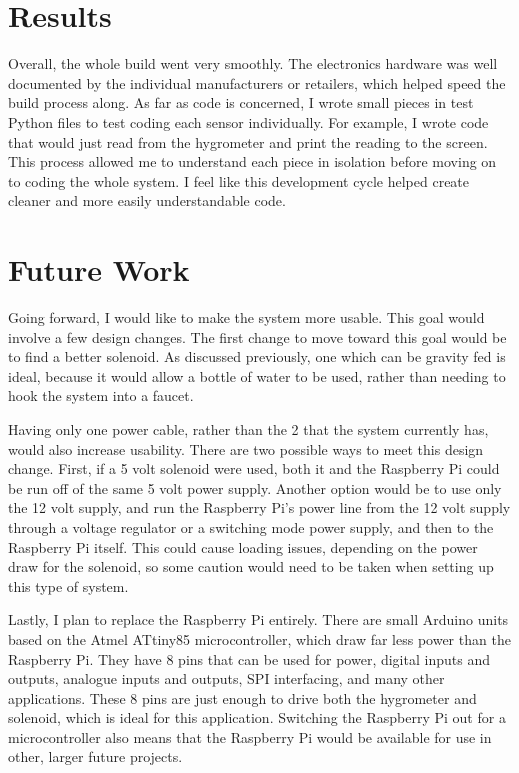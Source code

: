 \documentclass[11pt] {article}
\begin{document}

\section{Results}
Overall, the whole build went very smoothly. The electronics hardware was well documented by the individual
manufacturers or retailers, which helped speed the build process along. As far as code is concerned, I wrote small
pieces in test Python files to test coding each sensor individually. For example, I wrote code that would just read
from the hygrometer and print the reading to the screen. This process allowed me to understand each piece in isolation
before moving on to coding the whole system. I feel like this development cycle helped create cleaner and more easily
understandable code.

\section{Future Work}
Going forward, I would like to make the system more usable. This goal would involve a few design changes. The first
change to move toward this goal would be to find a better solenoid. As discussed previously, one which can be gravity
fed is ideal, because it would allow a bottle of water to be used, rather than needing to hook the system into a
faucet.

Having only one power cable, rather than the 2 that the system currently has, would also increase usability. There are
two possible ways to meet this design change. First, if a 5 volt solenoid were used, both it and the Raspberry Pi could
be run off of the same 5 volt power supply. Another option would be to use only the 12 volt supply, and run the
Raspberry Pi's power line from the 12 volt supply through a voltage regulator or a switching mode power supply,
and then to the Raspberry Pi itself. This could cause loading issues, depending on the power draw for the solenoid, so
some caution would need to be taken when setting up this type of system.

Lastly, I plan to replace the Raspberry Pi entirely. There are small Arduino units based on the Atmel ATtiny85
microcontroller, which draw far less power than the Raspberry Pi. They have 8 pins that can be used for power, digital
inputs and outputs, analogue inputs and outputs, SPI interfacing, and many other applications. These 8 pins are just
enough to drive both the hygrometer and solenoid, which is ideal for this application. Switching the Raspberry Pi out
for a microcontroller also means that the Raspberry Pi would be available for use in other, larger future projects.
\end{document}
